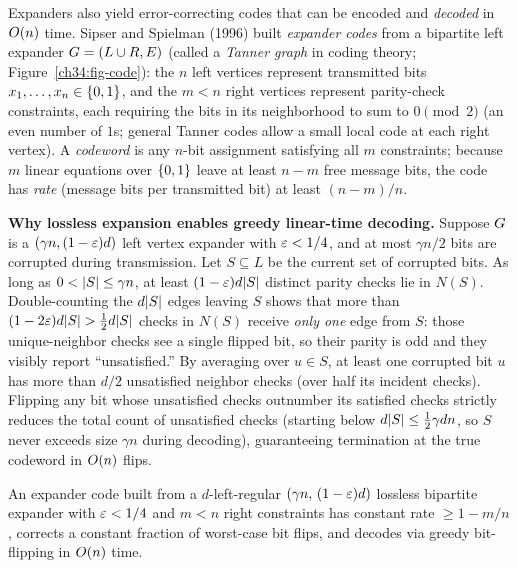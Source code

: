 Expanders also yield error-correcting codes that can be encoded and \emph{decoded} in $O(n)$ time. Sipser and Spielman (1996) built \emph{expander codes} from a bipartite left expander $G=(L\cup R,E)$ (called a \emph{Tanner graph} in coding theory; Figure~\ref{ch34:fig-code}): the $n$ left vertices represent transmitted bits $x_1,\dots,x_n\in\{0,1\}$, and the $m < n$ right vertices represent parity-check constraints, each requiring the bits in its neighborhood to sum to $0 \pmod{2}$ (an even number of $1$s; general Tanner codes allow a small local code at each right vertex). A \emph{codeword} is any $n$-bit assignment satisfying all $m$ constraints; because $m$ linear equations over $\{0,1\}$ leave at least $n-m$ free message bits, the code has \emph{rate} (message bits per transmitted bit) at least $(n-m)/n$.

\begin{whybox}
\textbf{Why lossless expansion enables greedy linear-time decoding.} Suppose $G$ is a $(\gamma n, (1-\varepsilon)d)$ left vertex expander with $\varepsilon < 1/4$, and at most $\gamma n/2$ bits are corrupted during transmission. Let $S\subseteq L$ be the current set of corrupted bits. As long as $0 < \lvert S\rvert \le \gamma n$, at least $(1-\varepsilon)d\lvert S\rvert$ distinct parity checks lie in $N(S)$. Double-counting the $d\lvert S\rvert$ edges leaving $S$ shows that more than $(1-2\varepsilon)d\lvert S\rvert > \frac{1}{2}d\lvert S\rvert$ checks in $N(S)$ receive \emph{only one} edge from $S$: those unique-neighbor checks see a single flipped bit, so their parity is odd and they visibly report ``unsatisfied.'' By averaging over $u\in S$, at least one corrupted bit $u$ has more than $d/2$ unsatisfied neighbor checks (over half its incident checks). Flipping any bit whose unsatisfied checks outnumber its satisfied checks strictly reduces the total count of unsatisfied checks (starting below $d\lvert S\rvert\le \frac{1}{2}\gamma d n$, so $S$ never exceeds size $\gamma n$ during decoding), guaranteeing termination at the true codeword in $O(n)$ flips.
\end{whybox}

\begin{theorem}
\label{ch34:thm-expander-codes}
An expander code built from a $d$-left-regular $(\gamma n,\,(1-\varepsilon)d)$ lossless bipartite expander with $\varepsilon<1/4$ and $m < n$ right constraints has constant rate $\ge 1-m/n$, corrects a constant fraction of worst-case bit flips, and decodes via greedy bit-flipping in $O(n)$ time.
\end{theorem}

